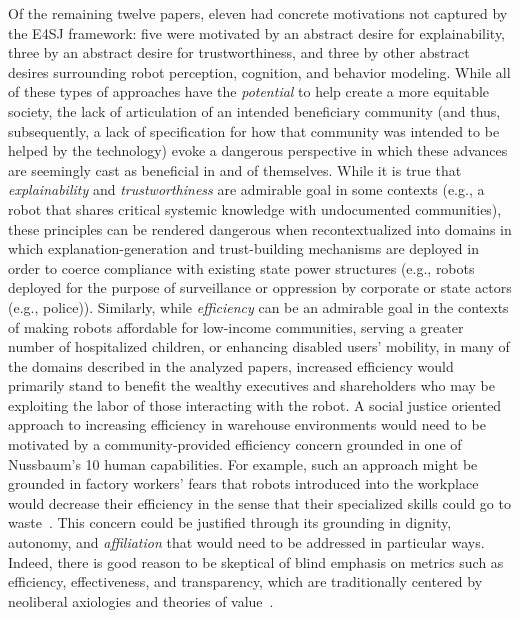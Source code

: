 \documentclass[letterpaper]{article} %
\begin{document}
Of the remaining twelve papers, eleven had concrete motivations not captured by the E4SJ framework: five were motivated by an abstract desire for explainability, three by an abstract desire for trustworthiness, and three by other abstract desires surrounding robot perception, cognition, and behavior modeling. While all of these types of approaches have the \textit{potential} to help create a more equitable society, the lack of articulation of an intended beneficiary community (and thus, subsequently, a lack of specification for how that community was intended to be helped by the technology) evoke a dangerous perspective in which these advances are seemingly cast as beneficial in and of themselves. 
%
While it is true that \textit{explainability} and \textit{trustworthiness} are admirable goal in some contexts (e.g., a robot that shares critical systemic knowledge with undocumented communities), these principles can be rendered dangerous when recontextualized into domains in which explanation-generation and trust-building mechanisms are deployed in order to coerce compliance with existing state power structures (e.g., robots deployed for the purpose of surveillance or oppression by corporate or state actors (e.g., police)). 
%
Similarly, while \textit{efficiency} can be an admirable goal in the contexts of making robots affordable for low-income communities, serving a greater number of hospitalized children, or enhancing disabled users' mobility, in many of the domains described in the analyzed papers, increased efficiency would primarily stand to benefit the wealthy executives and shareholders who may be exploiting the labor of those interacting with the robot. A social justice oriented approach to increasing efficiency in warehouse environments would need to be motivated by a community-provided efficiency concern grounded in one of Nussbaum's 10 human capabilities. For example, such an approach might be grounded in factory workers' fears that robots introduced into the workplace would decrease their efficiency in the sense that their specialized skills could go to waste~\cite{meissner2020friend}. This concern could be justified through its grounding in dignity, autonomy, and \textit{affiliation} that would need to be addressed in particular ways. 
%
Indeed, there is good reason to be skeptical of blind emphasis on metrics such as efficiency, effectiveness, and transparency, which are traditionally centered by neoliberal axiologies and theories of value~\cite{power2003evaluating,van2014neoliberal}.
\end{document}

